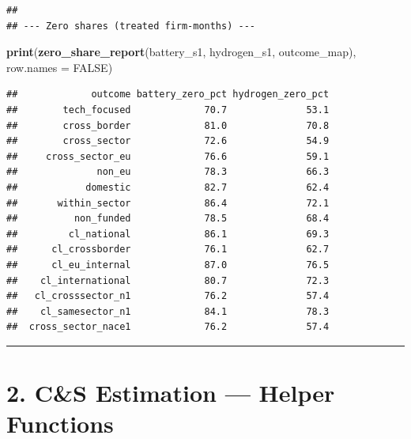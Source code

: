\documentclass[
]{article}
\newenvironment{Shaded}{\begin{snugshade}}{\end{snugshade}}
\newcommand{\AttributeTok}[1]{\textcolor[rgb]{0.13,0.29,0.53}{#1}}
\newcommand{\ConstantTok}[1]{\textcolor[rgb]{0.56,0.35,0.01}{#1}}
\newcommand{\FunctionTok}[1]{\textcolor[rgb]{0.13,0.29,0.53}{\textbf{#1}}}
\newcommand{\NormalTok}[1]{#1}
\begin{document}
\begin{verbatim}
## 
## --- Zero shares (treated firm-months) ---
\end{verbatim}

\begin{Shaded}
\begin{Highlighting}[]
\FunctionTok{print}\NormalTok{(}\FunctionTok{zero\_share\_report}\NormalTok{(battery\_s1, hydrogen\_s1, outcome\_map), }\AttributeTok{row.names =} \ConstantTok{FALSE}\NormalTok{)}
\end{Highlighting}
\end{Shaded}

\begin{verbatim}
##             outcome battery_zero_pct hydrogen_zero_pct
##        tech_focused             70.7              53.1
##        cross_border             81.0              70.8
##        cross_sector             72.6              54.9
##     cross_sector_eu             76.6              59.1
##              non_eu             78.3              66.3
##            domestic             82.7              62.4
##       within_sector             86.4              72.1
##          non_funded             78.5              68.4
##         cl_national             86.1              69.3
##      cl_crossborder             76.1              62.7
##      cl_eu_internal             87.0              76.5
##    cl_international             80.7              72.3
##   cl_crosssector_n1             76.2              57.4
##    cl_samesector_n1             84.1              78.3
##  cross_sector_nace1             76.2              57.4
\end{verbatim}

\begin{center}\rule{0.5\linewidth}{0.5pt}\end{center}

\section{2. C\&S Estimation --- Helper
Functions}\label{cs-estimation-helper-functions}
\end{document}
